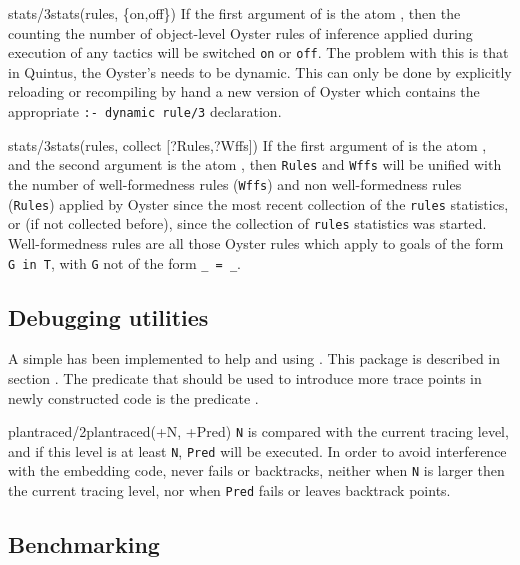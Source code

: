 \begin{predicate}{stats/3}{stats(rules, \{on,off\})}%
If the first argument of  is the atom {\tt {}},
then the counting the number of object-level Oyster
rules of inference applied during execution of any tactics will be
switched {\tt on} or {\tt off}. The problem with this is that in \notnice
Quintus, the Oyster's  needs to be dynamic. This can only be
done by explicitly reloading or recompiling by hand a new version of
Oyster which contains the appropriate {\tt :- dynamic rule/3}
declaration. 
\end{predicate}

\begin{predicate}{stats/3}{stats(rules, collect [?Rules,?Wffs])}%
If the first argument of  is the atom {\tt {}},
and the second argument is the atom {\tt {}}, then
{\tt Rules} and {\tt Wffs} will be unified with the number of
well-formedness rules ({\tt Wffs}) and non well-formedness rules
({\tt Rules}) applied by Oyster since the most recent
collection of the {\tt rules} statistics, or (if not collected
before), since the collection of {\tt rules} statistics was started.
Well-formedness rules are all those Oyster rules which apply to goals
of the form {\tt G in T}, with {\tt G} not of the form {\tt \_ = \_}. 
\end{predicate}

\subsection {Debugging utilities}

A simple  has been implemented to help 
and using \clam. This package is described in section
. The predicate that should be used to introduce more
trace points in newly constructed code is the predicate .

\begin{predicate}{plantraced/2}{plantraced(+N, +Pred)}%
{\tt N} is compared with the current tracing level, and if this
level is at least {\tt N},  {\tt Pred} will be executed. In order to
avoid interference with the embedding code,  never
fails or backtracks, neither when {\tt N} is larger then the current
tracing level, nor when {\tt Pred} fails or leaves backtrack points.
\end{predicate}

\subsection {Benchmarking}

